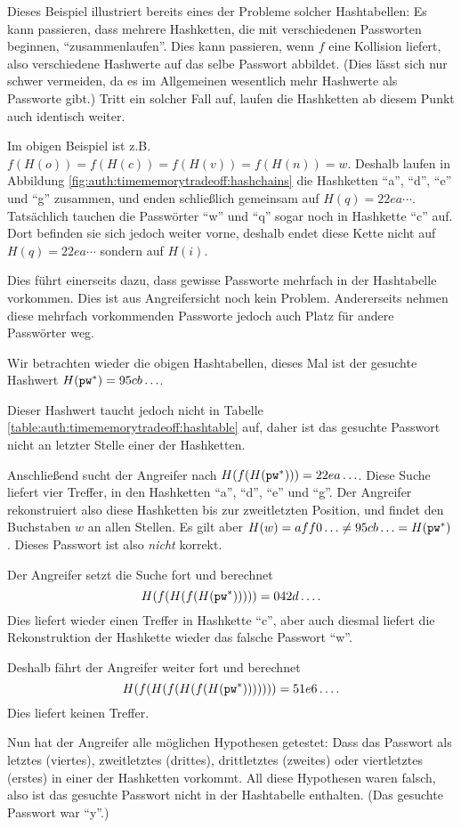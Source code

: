 Dieses Beispiel illustriert bereits eines der Probleme solcher
Hashtabellen: Es kann passieren, dass mehrere Hashketten, die mit
verschiedenen Passworten beginnen, "`zusammenlaufen"'.  Dies kann
passieren, wenn $f$ eine Kollision liefert, also verschiedene Hashwerte
auf das selbe Passwort abbildet. (Dies lässt sich nur schwer vermeiden,
da es im Allgemeinen wesentlich mehr Hashwerte als Passworte gibt.)
Tritt ein solcher Fall auf, laufen die Hashketten ab diesem Punkt auch
identisch weiter.

Im obigen Beispiel ist z.B. $f(H(o)) = f(H(c)) = f(H(v)) = f(H(n)) =
w$. Deshalb laufen in Abbildung
\ref{fig:auth:timememorytradeoff:hashchains} die Hashketten "`a"',
"`d"', "`e"' und "`g"' zusammen, und enden schließlich gemeinsam auf
$H(q) = 22ea\cdots$. Tatsächlich tauchen die Passwörter "`w"' und "`q"'
sogar noch in Hashkette "`c"' auf. Dort befinden sie sich jedoch weiter
vorne, deshalb endet diese Kette nicht auf $H(q) = 22ea\cdots$ sondern
auf $H(i)$.

Dies führt einerseits dazu, dass gewisse Passworte mehrfach in der
Hashtabelle vorkommen. Dies ist aus Angreifersicht noch kein
Problem. Andererseits nehmen diese mehrfach vorkommenden Passworte
jedoch auch Platz für andere Passwörter weg.

\begin{beispiel} 
  Wir betrachten wieder die obigen Hashtabellen, dieses
  Mal ist der gesuchte Hashwert $H(\texttt{pw}^*) = 95cb\ldots$.
  
  Dieser Hashwert taucht jedoch nicht in Tabelle
  \ref{table:auth:timememorytradeoff:hashtable} auf, daher ist das
  gesuchte Passwort nicht an letzter Stelle einer der Hashketten.
  
  Anschließend sucht der Angreifer nach $H(f(H(\texttt{pw}^*))) =
  22ea\ldots$. Diese Suche liefert vier Treffer, in den Hashketten "`a"',
  "`d"', "`e"' und "`g"'. Der Angreifer rekonstruiert also diese
  Hashketten bis zur zweitletzten Position, und findet den Buchstaben $w$
  an allen Stellen. Es gilt aber $H(w) = aff0\ldots \neq 95cb\ldots =
  H(\texttt{pw}^*)$. Dieses Passwort ist also \emph{nicht} korrekt.
  
  Der Angreifer setzt die Suche fort und berechnet
  \[H(f(H(f(H(\texttt{pw}^*))))) = 042d\ldots.\] Dies liefert wieder einen Treffer
  in Hashkette "`c"', aber auch diesmal liefert die Rekonstruktion der
  Hashkette wieder das falsche Passwort "`w"'.
  
  Deshalb fährt der Angreifer weiter fort und berechnet
  \[H(f(H(f(H(f(H(\texttt{pw}^*))))))) = 51e6\ldots.\] Dies liefert keinen Treffer.
  
  Nun hat der Angreifer alle möglichen Hypothesen getestet: Dass
  das Passwort als letztes (viertes), zweitletztes (drittes), drittletztes
  (zweites) oder viertletztes (erstes) in einer der Hashketten vorkommt.
  All diese Hypothesen waren falsch, also ist das gesuchte Passwort nicht
  in der Hashtabelle enthalten.  (Das gesuchte Passwort war "`y"'.)
\end{beispiel}
      
